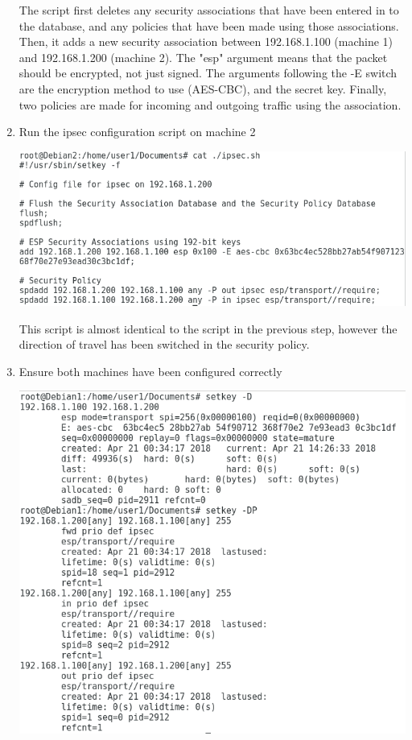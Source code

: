 \documentclass[12pt]{article}
\begin{document}
\begin{enumerate}
{The script first deletes any security associations that have been entered in to the database, and any policies that have been made using those associations. Then, it adds a new security association between 192.168.1.100 (machine 1) and 192.168.1.200 (machine 2). The "esp" argument means that the packet should be encrypted, not just signed. The arguments following the -E switch are the encryption method to use (AES-CBC), and the secret key. Finally, two policies are made for incoming and outgoing traffic using the association.
}

\newpage
\item{Run the ipsec configuration script on machine 2

\includegraphics[scale=0.5]{res/machine2/ipsec_config}

This script is almost identical to the script in the previous step, however the direction of travel has been switched in the security policy.
}

\item{Ensure both machines have been configured correctly

\includegraphics[scale=0.5]{res/machine1/ipsec_running}

}
\end{enumerate}
\end{document}
